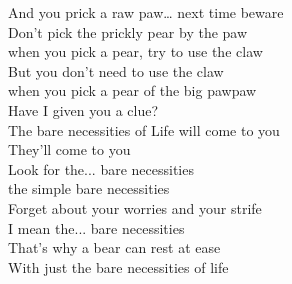And you prick a raw paw… next time beware \\
Don't pick the prickly pear by the paw\\
when you pick a pear, try to use the claw\\
But you don't need to use the claw\\
when you pick a pear of the big pawpaw\\
Have I given you a clue?\\
The bare necessities of Life will come to you\\
They’ll come to you\\
Look for the...  bare necessities\\
the simple bare necessities\\
Forget about your worries and your strife \\
I mean the...  bare necessities\\
That's why a bear can rest at ease\\
With just the bare necessities of life\\
\\
